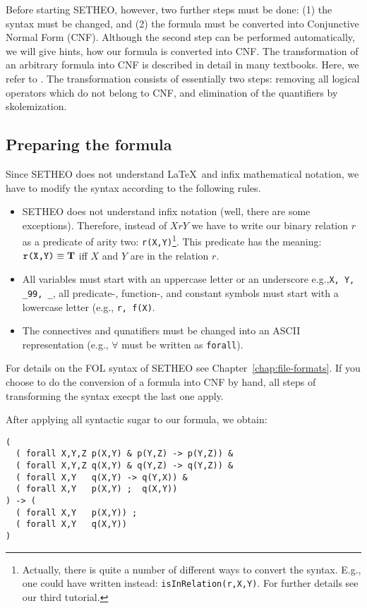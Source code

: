 Before starting SETHEO, however, two further steps must be done:
(1) the syntax must be changed, and
(2) the formula must be converted into Conjunctive Normal Form (CNF).
Although the second step can be performed automatically, we will 
give hints, how our formula is converted into CNF.
The transformation of an arbitrary formula into CNF is described in detail
in many textbooks. Here, we refer to \cite{Lov78,Chang75}.
The transformation consists of essentially two steps: 
removing all logical operators which do not belong to CNF, and
elimination of the quantifiers by skolemization.

\subsection{Preparing the formula}
Since SETHEO does not understand \LaTeX\ and infix mathematical
notation, we have to modify the syntax according to the following
rules.
\begin{itemize}
\item
SETHEO does not understand infix notation (well, there are some exceptions).
Therefore, instead of $XrY$ we have to write our binary relation $r$
as a predicate of arity two: {\tt r(X,Y)}\footnote{
	Actually, there is quite a number of different ways to
	convert the syntax. E.g., one could have written instead:
	{\tt isInRelation(r,X,Y)}. For further details see our third
	tutorial.}.
This predicate has the meaning: $\mbox{{\tt r(X,Y)}} \equiv {\rm\bf T}$
iff $X$ and $Y$ are in the relation $r$.

\item
All variables must start with an uppercase letter or an underscore
e.g.,{\tt X, Y, \_99, \_}, all
predicate-, function-, and constant symbols must start with a lowercase
letter (e.g., {\tt r, f(X)}.
\item
The connectives and qunatifiers must be changed into an ASCII representation
(e.g., $\forall$ must be written as {\tt forall}).
\end{itemize}

For details on the FOL syntax of SETHEO see Chapter~\ref{chap:file-formats}.
If you choose to do the conversion of a formula into CNF by hand,
all steps of transforming the syntax execpt the last one apply.

After applying all syntactic sugar to our formula, we obtain:
\begin{verbatim}
( 
  ( forall X,Y,Z p(X,Y) & p(Y,Z) -> p(Y,Z)) &
  ( forall X,Y,Z q(X,Y) & q(Y,Z) -> q(Y,Z)) &
  ( forall X,Y   q(X,Y) -> q(Y,X)) &
  ( forall X,Y   p(X,Y) ;  q(X,Y)) 
) -> (
  ( forall X,Y   p(X,Y)) ; 
  ( forall X,Y   q(X,Y)) 
)
\end{verbatim}

